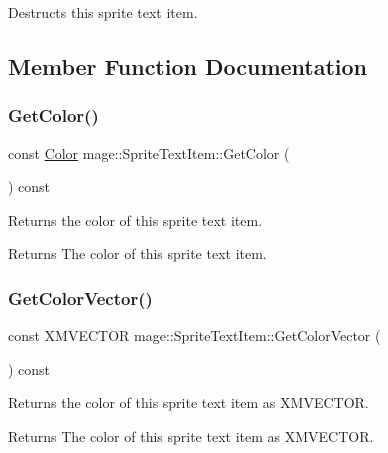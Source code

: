 Destructs this sprite text item. 

\subsection{Member Function Documentation}
\hypertarget{structmage_1_1_sprite_text_item_a5b98c37b46c928bacb5b82d648c0685e}{}\label{structmage_1_1_sprite_text_item_a5b98c37b46c928bacb5b82d648c0685e} 
\subsubsection{\texorpdfstring{Get\+Color()}{GetColor()}}
{\footnotesize\ttfamily const \hyperlink{structmage_1_1_color}{Color} mage\+::\+Sprite\+Text\+Item\+::\+Get\+Color (\begin{DoxyParamCaption}{ }\end{DoxyParamCaption}) const}

Returns the color of this sprite text item.

\begin{DoxyReturn}{Returns}
The color of this sprite text item. 
\end{DoxyReturn}
\hypertarget{structmage_1_1_sprite_text_item_aa42efb6fce8dd283ee2bfb16ce459f93}{}\label{structmage_1_1_sprite_text_item_aa42efb6fce8dd283ee2bfb16ce459f93} 
\subsubsection{\texorpdfstring{Get\+Color\+Vector()}{GetColorVector()}}
{\footnotesize\ttfamily const X\+M\+V\+E\+C\+T\+OR mage\+::\+Sprite\+Text\+Item\+::\+Get\+Color\+Vector (\begin{DoxyParamCaption}{ }\end{DoxyParamCaption}) const}

Returns the color of this sprite text item as {\ttfamily X\+M\+V\+E\+C\+T\+OR}.

\begin{DoxyReturn}{Returns}
The color of this sprite text item as {\ttfamily X\+M\+V\+E\+C\+T\+OR}. 
\end{DoxyReturn}
\hypertarget{structmage_1_1_sprite_text_item_a5011cbf5dfb7763caa8b9516be339530}{}\label{structmage_1_1_sprite_text_item_a5011cbf5dfb7763caa8b9516be339530} 
